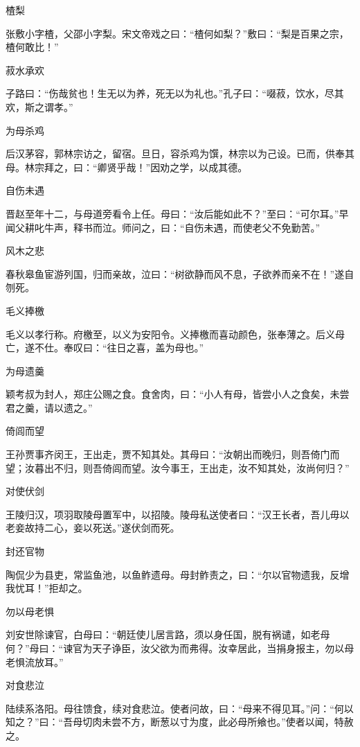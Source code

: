 \documentclass[a4paper,12pt,UTF8,twoside]{ctexbook}
\begin{document}
    楂梨
    
    张敷小字楂，父邵小字梨。宋文帝戏之曰：“楂何如梨？”敷曰：“梨是百果之宗，楂何敢比！”
    
    菽水承欢
    
    子路曰：“伤哉贫也！生无以为养，死无以为礼也。”孔子曰：“啜菽，饮水，尽其欢，斯之谓孝。”
    
    为母杀鸡
    
    后汉茅容，郭林宗访之，留宿。旦日，容杀鸡为馔，林宗以为己设。已而，供奉其母。林宗拜之，曰：“卿贤乎哉！”因劝之学，以成其德。
    
    自伤未遇
    
    晋赵至年十二，与母道旁看令上任。母曰：“汝后能如此不？”至曰：“可尔耳。”早闻父耕叱牛声，释书而泣。师问之，曰：“自伤未遇，而使老父不免勤苦。”
    
    风木之悲
    
    春秋皋鱼宦游列国，归而亲故，泣曰：“树欲静而风不息，子欲养而亲不在！”遂自刎死。
    
    毛义捧檄
    
    毛义以孝行称。府檄至，以义为安阳令。义捧檄而喜动颜色，张奉薄之。后义母亡，遂不仕。奉叹曰：“往日之喜，盖为母也。”
    
    为母遗羹
    
    颖考叔为封人，郑庄公赐之食。食舍肉，曰：“小人有母，皆尝小人之食矣，未尝君之羹，请以遗之。”
    
    倚闾而望
    
    王孙贾事齐闵王，王出走，贾不知其处。其母曰：“汝朝出而晚归，则吾倚门而望；汝暮出不归，则吾倚闾而望。汝今事王，王出走，汝不知其处，汝尚何归？”
    
    对使伏剑
    
    王陵归汉，项羽取陵母置军中，以招陵。陵母私送使者曰：“汉王长者，吾儿毋以老妾故持二心，妾以死送。”遂伏剑而死。
    
    封还官物
    
    陶侃少为县吏，常监鱼池，以鱼鲊遗母。母封鲊责之，曰：“尔以官物遗我，反增我忧耳！”拒却之。
    
    勿以母老惧
    
    刘安世除谏官，白母曰：“朝廷使儿居言路，须以身任国，脱有祸谴，如老母何？”母曰：“谏官为天子诤臣，汝父欲为而弗得。汝幸居此，当捐身报主，勿以母老惧流放耳。”
    
    对食悲泣
    
    陆续系洛阳。母往馈食，续对食悲泣。使者问故，曰：“母来不得见耳。”问：“何以知之？”曰：“吾母切肉未尝不方，断葱以寸为度，此必母所飨也。”使者以闻，特赦之。
    
\end{document}
